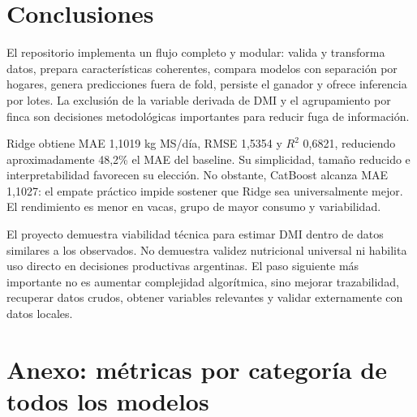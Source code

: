 \documentclass[11pt,a4paper]{article}
\begin{document}
\section{Conclusiones}

El repositorio implementa un flujo completo y modular: valida y transforma datos, prepara características coherentes, compara modelos con separación por hogares, genera predicciones fuera de fold, persiste el ganador y ofrece inferencia por lotes. La exclusión de la variable derivada de DMI y el agrupamiento por finca son decisiones metodológicas importantes para reducir fuga de información.

Ridge obtiene MAE 1,1019 kg MS/día, RMSE 1,5354 y $R^2$ 0,6821, reduciendo aproximadamente 48,2\% el MAE del baseline. Su simplicidad, tamaño reducido e interpretabilidad favorecen su elección. No obstante, CatBoost alcanza MAE 1,1027: el empate práctico impide sostener que Ridge sea universalmente mejor. El rendimiento es menor en vacas, grupo de mayor consumo y variabilidad.

El proyecto demuestra viabilidad técnica para estimar DMI dentro de datos similares a los observados. No demuestra validez nutricional universal ni habilita uso directo en decisiones productivas argentinas. El paso siguiente más importante no es aumentar complejidad algorítmica, sino mejorar trazabilidad, recuperar datos crudos, obtener variables relevantes y validar externamente con datos locales.

\appendix
\section{Anexo: métricas por categoría de todos los modelos}
\end{document}
